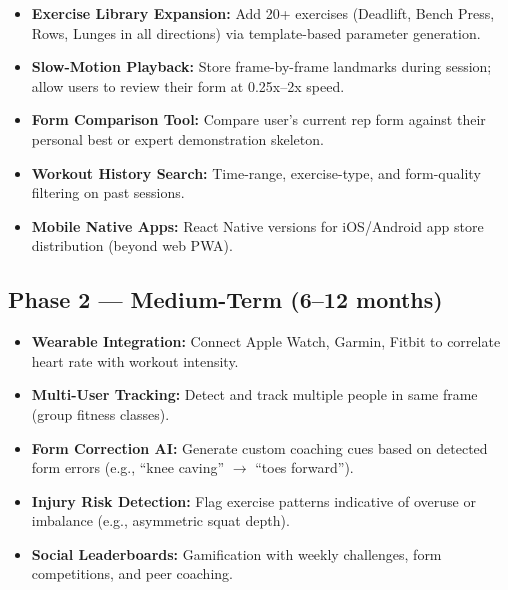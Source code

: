 \documentclass[12pt,a4paper]{article}
\begin{document}
\begin{itemize}[noitemsep, topsep=2pt]
  \item \textbf{Exercise Library Expansion:} Add 20+ exercises (Deadlift, 
        Bench Press, Rows, Lunges in all directions) via template-based parameter 
        generation.
  
  \item \textbf{Slow-Motion Playback:} Store frame-by-frame landmarks during 
        session; allow users to review their form at 0.25x--2x speed.
  
  \item \textbf{Form Comparison Tool:} Compare user's current rep form against 
        their personal best or expert demonstration skeleton.
  
  \item \textbf{Workout History Search:} Time-range, exercise-type, and 
        form-quality filtering on past sessions.
  
  \item \textbf{Mobile Native Apps:} React Native versions for iOS/Android app 
        store distribution (beyond web PWA).
\end{itemize}

\subsection{Phase 2 --- Medium-Term (6--12 months)}

\begin{itemize}[noitemsep, topsep=2pt]
  \item \textbf{Wearable Integration:} Connect Apple Watch, Garmin, Fitbit to 
        correlate heart rate with workout intensity.
  
  \item \textbf{Multi-User Tracking:} Detect and track multiple people in same 
        frame (group fitness classes).
  
  \item \textbf{Form Correction AI:} Generate custom coaching cues based on 
        detected form errors (e.g., ``knee caving'' $\rightarrow$ ``toes forward'').
  
  \item \textbf{Injury Risk Detection:} Flag exercise patterns indicative of 
        overuse or imbalance (e.g., asymmetric squat depth).
  
  \item \textbf{Social Leaderboards:} Gamification with weekly challenges, 
        form competitions, and peer coaching.
\end{itemize}
\end{document}
